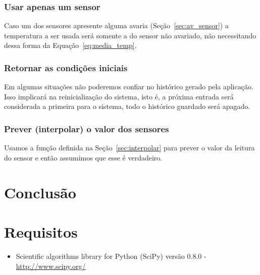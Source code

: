 \documentclass[a4paper,10pt]{article}
\begin{document}
\subsubsection{Usar apenas um sensor}\label{ac:falta_sensor}
Caso um dos sensores apresente alguma avaria (Seção~\ref{sec:av_sensor}) a
temperatura a ser usada será somente a do sensor não avariado, não necessitando
dessa forma da Equação~\ref{eq:media_temp}.

\subsubsection{Retornar as condições iniciais}\label{ac:condicoes_iniciais}
Em algumas situações não poderemos confiar no histórico gerado pela
aplicação. Isso implicará na reinicialização do sistema, isto é, a próxima
entrada será considerada a primeira para o sistema, todo o histórico
guardado será apagado.
	
\subsubsection{Prever (interpolar) o valor dos
	sensores}\label{ac:interpolar_sensores}
Usamos a função definida na Seção~\ref{sec:interpolar} para prever o valor da
leitura do sensor e então assumimos que esse é verdadeiro.

\section{Conclusão}

\section{Requisitos}

\begin{itemize}
	\item Scientific algorithms library for Python (SciPy) versão 0.8.0 -
		\url{http://www.scipy.org/}
\end{itemize}



\end{document}
